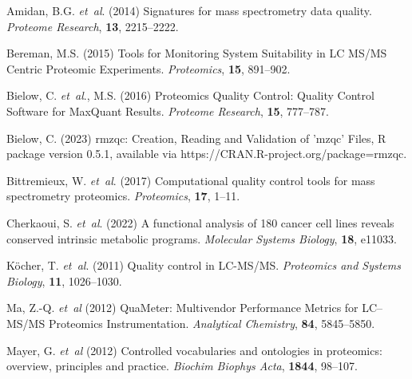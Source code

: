 \documentclass[unnumsec,webpdf,contemporary,large]{oup-authoring-template}%
\theoremstyle{thmstyleone}%
\theoremstyle{thmstyletwo}%
\theoremstyle{thmstylethree}%
\begin{document}
\begin{thebibliography}{10}
Amidan, B.G. \textit{et~al}. (2014) Signatures for mass spectrometry data
quality.
\textit{Proteome Research}, \textbf{13}, 2215--2222.

Bereman, M.S. (2015) Tools for Monitoring System Suitability in LC MS/MS
Centric Proteomic Experiments.
\textit{Proteomics}, \textbf{15}, 891--902.

Bielow, C. \textit{et~al}., M.S. (2016) Proteomics Quality Control: Quality 
Control Software for MaxQuant Results.
\textit{Proteome Research}, \textbf{15}, 777--787.

Bielow, C. (2023) rmzqc: Creation, Reading and Validation of 'mzqc' Files,
R package version 0.5.1, available via 
https://CRAN.R-project.org/package=rmzqc.

Bittremieux, W. \textit{et~al}. (2017) Computational quality control tools for
mass spectrometry proteomics.
\textit{Proteomics}, \textbf{17}, 1--11.

Cherkaoui, S. \textit{et~al}. (2022) A functional analysis of 180 cancer cell
lines reveals conserved intrinsic metabolic programs.
\textit{Molecular Systems Biology}, \textbf{18}, e11033.

K\"ocher, T. \textit{et~al}. (2011) Quality control in LC-MS/MS.
\textit{Proteomics and Systems Biology}, \textbf{11}, 1026--1030.


Ma, Z.-Q. \textit{et~al} (2012) QuaMeter: Multivendor Performance Metrics
for LC–MS/MS Proteomics Instrumentation.
\textit{Analytical Chemistry}, \textbf{84}, 5845--5850.

Mayer, G. \textit{et~al} (2012) Controlled vocabularies and ontologies in 
proteomics: overview, principles and practice.
\textit{Biochim Biophys Acta}, \textbf{1844}, 98--107.


\end{thebibliography}
\end{document}
